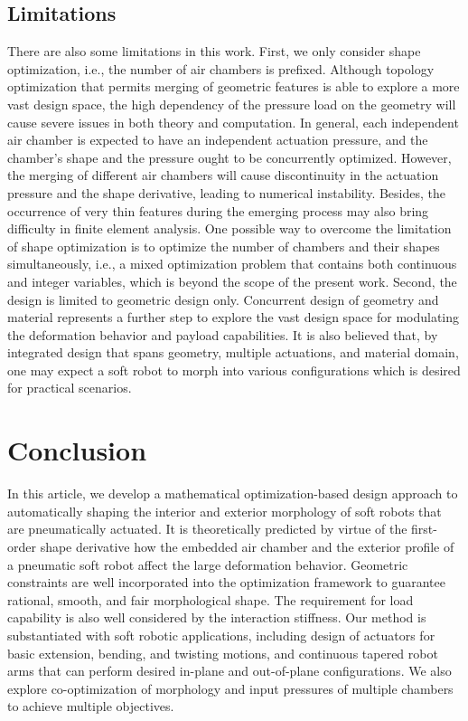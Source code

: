 \documentclass[journal]{IEEEtran}
\theoremstyle{definition}
\begin{document}
\subsection{Limitations}
There are also some limitations in this work. First, we only consider shape optimization, i.e., the number of air chambers is prefixed. Although topology optimization that permits merging of geometric features is able to explore a more vast design space, the high dependency of the pressure load on the geometry will cause severe issues in both theory and computation. In general, each independent air chamber is expected to have an independent actuation pressure, and the chamber's shape and the pressure ought to be concurrently optimized. However, the merging of different air chambers will cause discontinuity in the actuation pressure and the shape derivative, leading to numerical instability. Besides, the occurrence of very thin features during the emerging process may also bring difficulty in finite element analysis. One possible way to overcome the limitation of shape optimization is to optimize the number of chambers and their shapes simultaneously, i.e., a mixed optimization problem that contains both continuous and integer variables, which is beyond the scope of the present work. Second, the design is limited to geometric design only. Concurrent design of geometry and material represents a further step to explore the vast design space for modulating the deformation behavior and payload capabilities. It is also believed that, by integrated design that spans geometry, multiple actuations, and material domain, one may expect a soft robot to morph into various configurations which is desired for practical scenarios.

\section{Conclusion}
In this article, we develop a mathematical optimization-based design approach to automatically shaping the interior and exterior morphology of soft robots that are pneumatically actuated. It is theoretically predicted by virtue of the first-order shape derivative how the embedded air chamber and the exterior profile of a pneumatic soft robot affect the large deformation behavior. Geometric constraints are well incorporated into the optimization framework to guarantee rational, smooth, and fair morphological shape. The requirement for load capability is also well considered by the interaction stiffness. Our method is substantiated with soft robotic applications, including design of actuators for basic extension, bending, and twisting motions, and continuous tapered robot arms that can perform desired in-plane and out-of-plane configurations. We also explore co-optimization of morphology and input pressures of multiple chambers to achieve multiple objectives.
\end{document}
